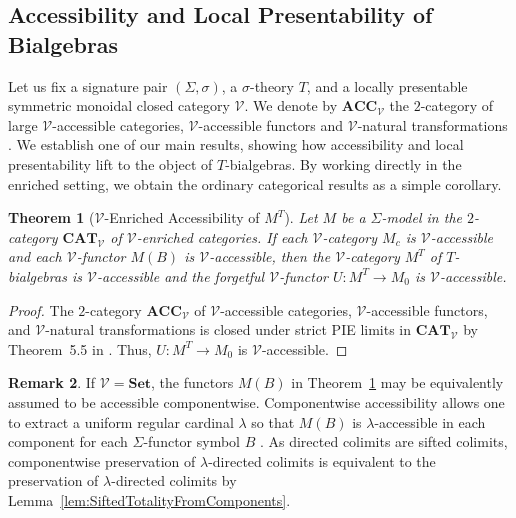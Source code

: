 \documentclass[11pt]{article}
\theoremstyle{plain}
\newtheorem{theorem}{Theorem}[section]
\theoremstyle{definition}
\newtheorem{remark}[theorem]{Remark}
\numberwithin{equation}{section}
\newcommand{\Set}{\mathbf{Set}}
\newcommand{\CAT}{\mathbf{CAT}}
\newcommand{\ACC}{\mathbf{ACC}}
\newcommand{\V}{\mathcal{V}}
\begin{document}
\subsection{Accessibility and Local Presentability of Bialgebras}
Let us fix a signature pair $(\Sigma,\sigma)$, a $\sigma$-theory $T$, and a locally presentable symmetric monoidal closed category $\V$. We denote by $\ACC_\V$ the $2$-category of large $\V$-accessible categories, $\V$-accessible functors and $\V$-natural transformations \cite{LACK2023107196}. We establish one of our main results, showing how accessibility and local presentability lift to the object of $T$-bialgebras. By working directly in the enriched setting, we obtain the ordinary categorical results as a simple corollary.

\begin{theorem}[$\V$-Enriched Accessibility of $M^T$]\label{thm:enriched_accessability_lifting}
    Let $M$ be a $\Sigma$-model in the $2$-category $\CAT_{\V}$ of $\V$-enriched categories. If each $\V$-category $M_c$ is $\V$-accessible and each $\V$-functor $M(B)$ is $\V$-accessible, then the $\V$-category $M^T$ of $T$-bialgebras is $\V$-accessible and the forgetful $\V$-functor $U\colon M^T\to M_0$ is $\V$-accessible.
\end{theorem}
\begin{proof}
   The $2$-category $\mathbf{ACC}_{\V}$ of $\V$-accessible categories, $\V$-accessible functors, and $\V$-natural transformations is closed under strict PIE limits in $\CAT_{\V}$ by Theorem~5.5 in \cite{LACK2023107196}. Thus, $U\colon M^T\to M_0$ is $\V$-accessible.
\end{proof}


\begin{remark}
   If $\V = \Set$, the functors $M(B)$ in Theorem~\ref{thm:enriched_accessability_lifting} may be equivalently assumed to be accessible componentwise. Componentwise accessibility allows one to extract a uniform regular cardinal $\lambda$ so that $M(B)$ is $\lambda$-accessible in each component for each $\Sigma$-functor symbol $B$ \cite[Example 2.13(6)]{LPC}. As directed colimits are sifted colimits, componentwise preservation of $\lambda$-directed colimits is equivalent to the preservation of $\lambda$-directed colimits by Lemma~\ref{lem:SiftedTotalityFromComponents}.
\end{remark}
\end{document}
